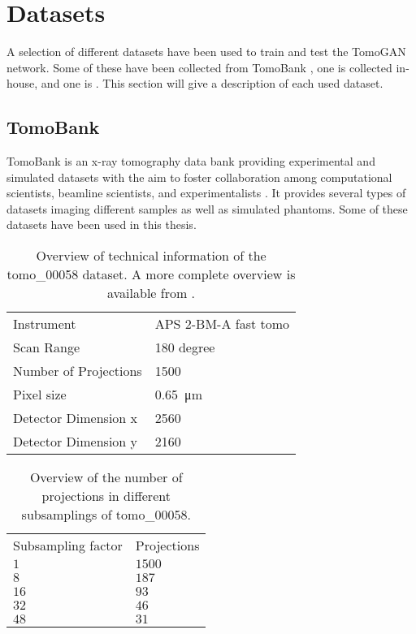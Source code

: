 
\section{Datasets}
\label{sec:method:datasets}
A selection of different datasets have been used to train and test the TomoGAN network. Some of these have been collected from TomoBank \cite{TomoBank}, one is collected in-house, and one is . This section will give a description of each used dataset. 

\subsection{TomoBank}
TomoBank is an x-ray tomography data bank providing experimental and simulated datasets with the aim to foster collaboration among computational scientists, beamline scientists, and experimentalists \cite{TomoBank}. It provides several types of datasets imaging different samples as well as simulated phantoms. Some of these datasets have been used in this thesis.


\begin{table}[htbp]
    \centering
    \caption[Dataset information tomo\_00058]{Overview of technical information of the tomo\_00058 dataset. A more complete overview is available from \cite{datasetglassspheres}. }
    \label{tab:tomo00058}
    \begin{tabular}{ll}
    \hline
    Instrument & APS 2-BM-A fast tomo \\
    Scan Range & 180 degree \\
    Number of Projections & 1500 \\
    Pixel size & \SI{0.65}{\micro \meter} \\
    Detector Dimension x & 2560 \\
    Detector Dimension y & 2160 \\
    \hline
    \end{tabular}
\end{table}

\begin{table}[htbp]
    \centering
    \caption[Projection subsampling overview tomo\_00058]{Overview of the number of projections in different subsamplings of tomo\_00058. }
    \label{tab:projectionsubsampling}
    \begin{tabular}{ll}
    \hline
    Subsampling factor & Projections \\
    \hhline{==}
    $1$ & $1500$ \\
    $8$ & $187$ \\
    $16$ & $93$ \\
    $32$ & $46$ \\
    $48$ & $31$ \\
    \hline
    \end{tabular}
\end{table}

